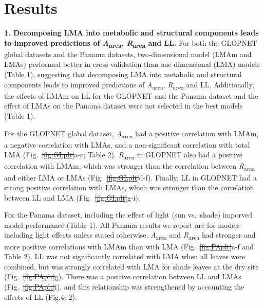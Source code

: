 \documentclass[
  12pt,
  a4paper,
,tablecaptionabove
]{scrartcl}
\providecommand{\DIFaddtex}[1]{{\protect\color{blue}\uwave{#1}}} %
\providecommand{\DIFdeltex}[1]{{\protect\color{red}\sout{#1}}}                      %
\providecommand{\DIFaddbegin}{} %
\providecommand{\DIFaddend}{} %
\providecommand{\DIFdelbegin}{} %
\providecommand{\DIFdelend}{} %
\providecommand{\DIFadd}[1]{\texorpdfstring{\DIFaddtex{#1}}{#1}} %
\providecommand{\DIFdel}[1]{\texorpdfstring{\DIFdeltex{#1}}{}} %
\newcommand{\DIFscaledelfig}{0.5}
\newlength{\DIFdelgraphicswidth} %
\newlength{\DIFdelgraphicsheight} %
\newcommand{\DIFaddincludegraphics}[2][]{{\color{blue}\fbox{\DIFOincludegraphics[#1]{#2}}}} %
\newcommand{\DIFdelincludegraphics}[2][]{%
\sbox{\DIFdelgraphicsbox}{\DIFOincludegraphics[#1]{#2}}%
\settoboxwidth{\DIFdelgraphicswidth}{\DIFdelgraphicsbox} %
\settoboxtotalheight{\DIFdelgraphicsheight}{\DIFdelgraphicsbox} %
\scalebox{\DIFscaledelfig}{%
\parbox[b]{\DIFdelgraphicswidth}{\usebox{\DIFdelgraphicsbox}\\[-\baselineskip] \rule{\DIFdelgraphicswidth}{0em}}\llap{\resizebox{\DIFdelgraphicswidth}{\DIFdelgraphicsheight}{%
\setlength{\unitlength}{\DIFdelgraphicswidth}%
\begin{picture}(1,1)%
\thicklines\linethickness{2pt} %
{\color[rgb]{1,0,0}\put(0,0){\framebox(1,1){}}}%
{\color[rgb]{1,0,0}\put(0,0){\line( 1,1){1}}}%
{\color[rgb]{1,0,0}\put(0,1){\line(1,-1){1}}}%
\end{picture}%
}\hspace*{3pt}}} %
} %
\DeclareRobustCommand{\DIFaddbegin}{\DIFOaddbegin \let\includegraphics\DIFaddincludegraphics} %
\DeclareRobustCommand{\DIFaddend}{\DIFOaddend \let\includegraphics\DIFOincludegraphics} %
\DeclareRobustCommand{\DIFdelbegin}{\DIFOdelbegin \let\includegraphics\DIFdelincludegraphics} %
\DeclareRobustCommand{\DIFdelend}{\DIFOaddend \let\includegraphics\DIFOincludegraphics} %
\begin{document}
\hypertarget{results}{%
\section{Results}\label{results}}

\textbf{1. Decomposing LMA into metabolic and structural components
leads to improved predictions of \emph{A}\textsubscript{area},
\emph{R}\textsubscript{area} and LL.} For both the GLOPNET global
datasets and the Panama datasets, two-dimensional model (LMAm and LMAs)
performed better in cross validation than one-dimensional (LMA) models
(Table 1), suggesting that decomposing LMA into metabolic and structural
components leads to improved predictions of
\emph{A}\textsubscript{area}, \emph{R}\textsubscript{area} and LL.
Additionally, the effects of LMAm on LL for the GLOPNET and the Panama
dataset and the effect of LMAs on the Panama dataset were not selected
in the best models (Table 1).

For the GLOPNET global dataset, \emph{A}\textsubscript{area} had a
positive correlation with LMAm, a negative correlation with LMAs, and a
non-significant correlation with total LMA (Fig.~\DIFdelbegin \DIFdel{\ref{fig:GLplt}}\DIFdelend \DIFaddbegin \DIFadd{\ref{fig-GLplt}}\DIFaddend a-c;
Table 2). \emph{R}\textsubscript{area} in GLOPNET also had a positive
correlation with LMAm, which was stronger than the correlation between
\emph{R}\textsubscript{area} and either LMA or LMAs
(Fig.~\DIFdelbegin \DIFdel{\ref{fig:GLplt}}\DIFdelend \DIFaddbegin \DIFadd{\ref{fig-GLplt}}\DIFaddend d-f). Finally, LL in GLOPNET had a strong positive
correlation with LMAs, which was stronger than the correlation between
LL and LMA (Fig.~\DIFdelbegin \DIFdel{\ref{fig:GLplt}}\DIFdelend \DIFaddbegin \DIFadd{\ref{fig-GLplt}}\DIFaddend g-i).

For the Panama dataset, including the effect of light (sun vs.~shade)
imporved model performance (Table 1). All Panama results we report are
for models including light effects unless stated otherwise.
\emph{A}\textsubscript{area} and \emph{R}\textsubscript{area} had
stronger and more positive correlations with LMAm than with LMA
(Fig.~\DIFdelbegin \DIFdel{\ref{fig:PAplt}}\DIFdelend \DIFaddbegin \DIFadd{\ref{fig-PAplt}}\DIFaddend a-f and Table 2). LL was not significantly
correlated with LMA when all leaves were combined, but was strongly
correlated with LMA for shade leaves at the dry site
(Fig.~\DIFdelbegin \DIFdel{\ref{fig:PAplt}}\DIFdelend \DIFaddbegin \DIFadd{\ref{fig-PAplt}}\DIFaddend g). There was a positive correlation between LL and
LMAs (Fig.~\DIFdelbegin \DIFdel{\ref{fig:PAplt}}\DIFdelend \DIFaddbegin \DIFadd{\ref{fig-PAplt}}\DIFaddend i), and this relationship was strengthened by
accounting the effects of LL (Fig.\DIFdelbegin \DIFdel{4; 2}\DIFdelend \DIFaddbegin \DIFadd{~\ref{fig-LLplt}}\DIFaddend ).
\end{document}

